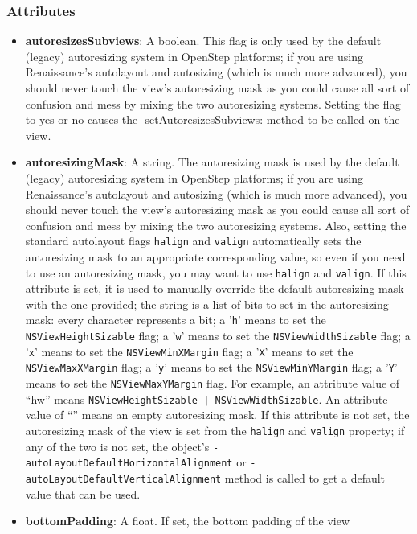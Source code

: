 \subsubsection{Attributes}
\begin{itemize}
\item {\bf autoresizesSubviews}: A boolean.  This flag is only used by
  the default (legacy) autoresizing system in OpenStep platforms; if
  you are using Renaissance's autolayout and autosizing (which is much
  more advanced), you should never touch the view's autoresizing mask
  as you could cause all sort of confusion and mess by mixing the two
  autoresizing systems.  Setting the flag to yes or no causes the
  -setAutoresizesSubviews: method to be called on the view.
\item {\bf autoresizingMask}: A string.  The autoresizing mask is used
  by the default (legacy) autoresizing system in OpenStep platforms;
  if you are using Renaissance's autolayout and autosizing (which is
  much more advanced), you should never touch the view's autoresizing
  mask as you could cause all sort of confusion and mess by mixing the
  two autoresizing systems.  Also, setting the standard autolayout
  flags \texttt{halign} and \texttt{valign} automatically sets the
  autoresizing mask to an appropriate corresponding value, so even if
  you need to use an autoresizing mask, you may want to use
  \texttt{halign} and \texttt{valign}.  If this attribute is
  set, it is used to manually override the default autoresizing mask
  with the one provided; the string is a list of bits to set in the
  autoresizing mask: every character represents a bit; a '\texttt{h}'
  means to set the \texttt{NSViewHeightSizable} flag; a '\texttt{w}'
  means to set the \texttt{NSViewWidthSizable} flag; a '\texttt{x}'
  means to set the \texttt{NSViewMinXMargin} flag; a '\texttt{X}'
  means to set the \texttt{NSViewMaxXMargin} flag; a '\texttt{y}'
  means to set the \texttt{NSViewMinYMargin} flag; a '\texttt{Y}'
  means to set the \texttt{NSViewMaxYMargin} flag.  For example, an
  attribute value of ``hw'' means \texttt{NSViewHeightSizable |
    NSViewWidthSizable}.  An attribute value of ``'' means an empty
  autoresizing mask.  If this attribute is not set, the autoresizing
  mask of the view is set from the \texttt{halign} and \texttt{valign}
  property; if any of the two is not set, the object's
  \texttt{-autoLayoutDefaultHorizontalAlignment} or
  \texttt{-autoLayoutDefaultVerticalAlignment} method is called to get
  a default value that can be used.
\item {\bf bottomPadding}: A float.  If set, the bottom padding of the view

\end{itemize}
